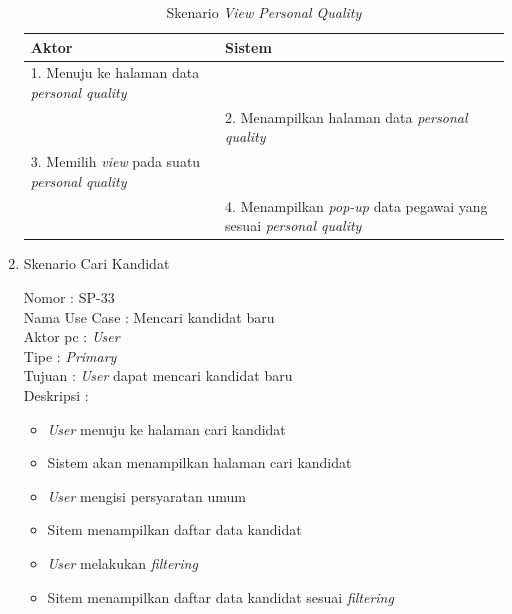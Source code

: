\begin{enumerate}
\begin{itemize}
\end{itemize}

\begin{table}
	\caption{Skenario \textit{View Personal Quality}}
	\centering
	\begin{tabular}{ | l | p{52.5mm}|}
		\hline 
		\textbf{Aktor} & \textbf{Sistem} \\
		\hline
		
		1.	Menuju ke halaman data \textit{personal quality} &  \\
		
		\hline
		
		&  2.	Menampilkan halaman data \textit{personal quality} \\
		
		\hline
		
		3. Memilih \textit{view} pada suatu\textit{ personal quality} & \\
		
		\hline
		
		& 4.	Menampilkan \textit{pop-up} data pegawai yang sesuai \textit{personal quality} \\
		\hline
		
	\end{tabular}
\end{table}

\item Skenario Cari Kandidat

Nomor \kern 3.6pc : SP-33 \\
Nama Use Case : Mencari kandidat baru \\
Aktor  pc : \textit{User} \\
Tipe \kern 4.6pc : \textit{Primary} \\
Tujuan \kern 3.6pc : \textit{User} dapat mencari kandidat baru \\
Deskripsi \kern 2.5pc : 

\begin{itemize}
	\item \textit{User} menuju ke halaman cari kandidat
	\item Sistem akan menampilkan halaman cari kandidat
	\item \textit{User} mengisi persyaratan umum
	\item Sitem menampilkan daftar data kandidat
	\item \textit{User} melakukan \textit{filtering}
	\item Sitem menampilkan daftar data kandidat sesuai \textit{filtering}
	

\end{itemize}
\end{enumerate}
